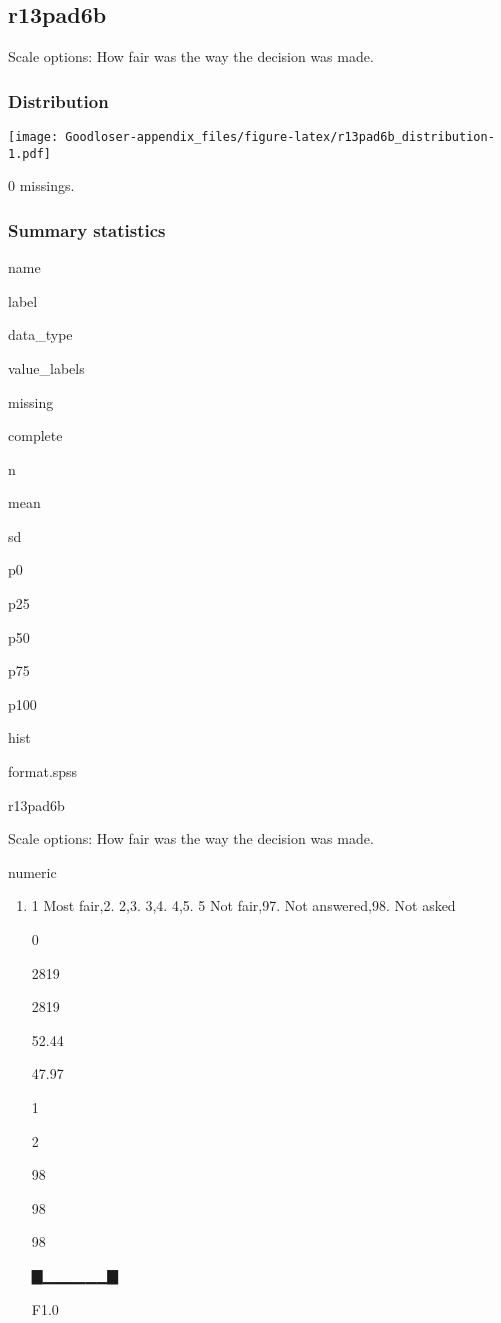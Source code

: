 \documentclass[]{book}
\providecommand{\tightlist}{%
  \setlength{\itemsep}{0pt}\setlength{\parskip}{0pt}}
\begin{document}
\subsection{r13pad6b}\label{r13pad6b}

Scale options: How fair was the way the decision was made.

\subsubsection{Distribution}\label{r13pad6b_distribution}

\texttt{[image: Goodloser-appendix\_files/figure-latex/r13pad6b\_distribution-1.pdf]}

0 missings.

\subsubsection{Summary statistics}\label{r13pad6b_summary}

name

label

data\_type

value\_labels

missing

complete

n

mean

sd

p0

p25

p50

p75

p100

hist

format.spss

r13pad6b

Scale options: How fair was the way the decision was made.

numeric

\begin{enumerate}
\def\labelenumi{\arabic{enumi}.}
\tightlist
\item
  1 Most fair,2. 2,3. 3,4. 4,5. 5 Not fair,97. Not answered,98. Not
  asked

  0

  2819

  2819

  52.44

  47.97

  1

  2

  98

  98

  98

  ▇▁▁▁▁▁▁▇

  F1.0
\end{enumerate}
\end{document}
